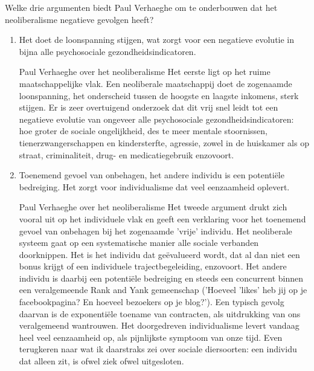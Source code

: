 \documentclass[main.tex]{subfiles}
\begin{document}
\begin{examenvraag}
    \begin{vraag}
        Welke drie argumenten biedt Paul Verhaeghe om te onderbouwen dat het neoliberalisme negatieve gevolgen heeft?
    \end{vraag}

    \begin{antwoord}
    \begin{enumerate}
    
    	\item Het doet de loonspanning stijgen, wat zorgt voor een negatieve 
    	evolutie in bijna alle psychosociale gezondheidsindicatoren.
    	
    	\begin{citaat}{Paul Verhaeghe over het neoliberalisme}
    		Het eerste ligt op het ruime maatschappelijke vlak. Een neoliberale 
    		maatschappij doet de zogenaamde loonspanning, het onderscheid tussen 
    		de hoogste en laagste inkomens, sterk stijgen. Er is zeer overtuigend 
    		onderzoek dat dit vrij snel leidt tot een negatieve evolutie van 
    		ongeveer alle psychosociale gezondheidsindicatoren: hoe groter de 
    		sociale ongelijkheid, des te meer mentale stoornissen, 
    		tienerzwangerschappen en kindersterfte, agressie, zowel in de 
    		huiskamer als op straat, criminaliteit, drug- en medicatiegebruik 
    		enzovoort.
		\end{citaat}
		
		\item Toenemend gevoel van onbehagen, het andere individu is een 
		potentiële bedreiging. Het zorgt voor individualisme dat veel eenzaamheid 
		oplevert.
		
		\begin{citaat}{Paul Verhaeghe over het neoliberalisme}
Het tweede argument drukt zich vooral uit op het individuele vlak en geeft een verklaring voor
het toenemend gevoel van onbehagen bij het zogenaamde 'vrije' individu. Het neoliberale systeem gaat
op een systematische manier alle sociale verbanden doorknippen. Het is het individu dat geëvalueerd
wordt, dat al dan niet een bonus krijgt of een individuele trajectbegeleiding, enzovoort. Het andere
individu is daarbij een potentiële bedreiging en steeds een concurrent binnen een veralgemeende Rank
and Yank gemeenschap ('Hoeveel 'likes' heb jij op je facebookpagina? En hoeveel bezoekers op je
blog?'). Een typisch gevolg daarvan is de exponentiële toename van contracten, als uitdrukking van
ons veralgemeend wantrouwen. Het doorgedreven individualisme levert vandaag heel veel
eenzaamheid op, als pijnlijkste symptoom van onze tijd. Even terugkeren naar wat ik daarstraks zei
over sociale diersoorten: een individu dat alleen zit, is ofwel ziek ofwel uitgesloten.
		\end{citaat}
		

\end{enumerate}
\end{antwoord}
\end{examenvraag}
\end{document}
